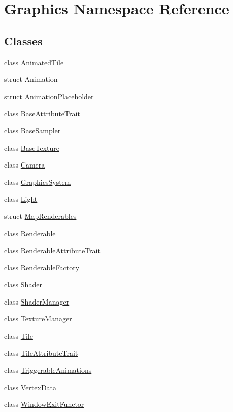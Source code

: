 \hypertarget{namespace_graphics}{}\section{Graphics Namespace Reference}
\label{namespace_graphics}
\subsection*{Classes}
\begin{DoxyCompactItemize}
\item 
class \hyperlink{class_graphics_1_1_animated_tile}{Animated\+Tile}
\item 
struct \hyperlink{struct_graphics_1_1_animation}{Animation}
\item 
struct \hyperlink{struct_graphics_1_1_animation_placeholder}{Animation\+Placeholder}
\item 
class \hyperlink{class_graphics_1_1_base_attribute_trait}{Base\+Attribute\+Trait}
\item 
class \hyperlink{class_graphics_1_1_base_sampler}{Base\+Sampler}
\item 
class \hyperlink{class_graphics_1_1_base_texture}{Base\+Texture}
\item 
class \hyperlink{class_graphics_1_1_camera}{Camera}
\item 
class \hyperlink{class_graphics_1_1_graphics_system}{Graphics\+System}
\item 
class \hyperlink{class_graphics_1_1_light}{Light}
\item 
struct \hyperlink{struct_graphics_1_1_map_renderables}{Map\+Renderables}
\item 
class \hyperlink{class_graphics_1_1_renderable}{Renderable}
\item 
class \hyperlink{class_graphics_1_1_renderable_attribute_trait}{Renderable\+Attribute\+Trait}
\item 
class \hyperlink{class_graphics_1_1_renderable_factory}{Renderable\+Factory}
\item 
class \hyperlink{class_graphics_1_1_shader}{Shader}
\item 
class \hyperlink{class_graphics_1_1_shader_manager}{Shader\+Manager}
\item 
class \hyperlink{class_graphics_1_1_texture_manager}{Texture\+Manager}
\item 
class \hyperlink{class_graphics_1_1_tile}{Tile}
\item 
class \hyperlink{class_graphics_1_1_tile_attribute_trait}{Tile\+Attribute\+Trait}
\item 
class \hyperlink{class_graphics_1_1_triggerable_animations}{Triggerable\+Animations}
\item 
class \hyperlink{class_graphics_1_1_vertex_data}{Vertex\+Data}
\item 
class \hyperlink{class_graphics_1_1_window_exit_functor}{Window\+Exit\+Functor}
\end{DoxyCompactItemize}
